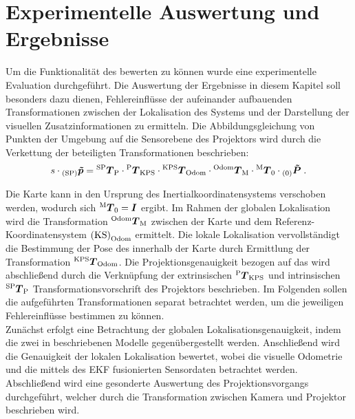 \chapter{Experimentelle Auswertung und Ergebnisse}
\label{chap.results}
\prever{
}


Um die Funktionalität des  bewerten zu können wurde eine experimentelle Evaluation durchgeführt. Die Auswertung der Ergebnisse in diesem Kapitel soll besonders dazu dienen, Fehlereinflüsse der aufeinander aufbauenden Transformationen zwischen der Lokalisation des Systems und der Darstellung der visuellen Zusatzinformationen zu ermitteln. Die Abbildungsgleichung von Punkten der Umgebung auf die Sensorebene des Projektors wird durch die Verkettung der beteiligten Transformationen beschrieben:
%
\begin{equation}
s \cdot {_{{\mathrm{(SP)}}}}\mbox{\boldmath{$\tilde{p}$}} = {^{\mathrm{SP}}\mbox{\boldmath{$T$}}_{\mathrm{P}}}\cdot{^{\mathrm{P}}\mbox{\boldmath{$T$}}_{\mathrm{KPS}}}\cdot{^{\mathrm{KPS}}\mbox{\boldmath{$T$}}_{\mathrm{Odom}}}\cdot{^{\mathrm{Odom}}\mbox{\boldmath{$T$}}_{\mathrm{M}}}\cdot{^{\mathrm{M}}\mbox{\boldmath{$T$}}_{\mathrm{0}}}\cdot{_{{\mathrm{(0)}}}}\mbox{\boldmath{$\tilde{P}$}} \; \text{.}
\end{equation}

Die Karte kann in den Ursprung des Inertialkoordinatensystems verschoben werden, wodurch sich ${^{\mathrm{M}}\mbox{\boldmath{$T$}}_{\mathrm{0}}} = \mbox{\boldmath{$I$}}$ ergibt. Im Rahmen der globalen Lokalisation wird die Transformation ${^{\mathrm{Odom}}\mbox{\boldmath{$T$}}_{\mathrm{M}}}$ zwischen der Karte und dem Referenz-Koordinatensystem ${\mathrm{(KS)}}_{\mathrm{Odom}}$ ermittelt. Die lokale Lokalisation vervollständigt die Bestimmung der Pose des  innerhalb der Karte durch Ermittlung der Transformation ${^{\mathrm{KPS}}\mbox{\boldmath{$T$}}_{\mathrm{Odom}}}$. Die Projektionsgenauigkeit bezogen auf das \kps{} wird abschließend durch die Verknüpfung der extrinsischen ${^{\mathrm{P}}\mbox{\boldmath{$T$}}_{\mathrm{KPS}}}$ und intrinsischen ${^{\mathrm{SP}}\mbox{\boldmath{$T$}}_{\mathrm{P}}}$ Transformationsvorschrift des Projektors beschrieben. Im Folgenden sollen die aufgeführten Transformationen separat betrachtet werden, um die jeweiligen Fehlereinflüsse bestimmen zu können.\\

\prever{
}
Zunächst erfolgt eine Betrachtung der globalen Lokalisationsgenauigkeit, indem die zwei in  beschriebenen Modelle gegenübergestellt werden. Anschließend wird die Genauigkeit der lokalen Lokalisation bewertet, wobei die visuelle Odometrie und die mittels des EKF fusionierten Sensordaten betrachtet werden. Abschließend wird eine gesonderte Auswertung des Projektionsvorgangs durchgeführt, welcher durch die Transformation zwischen Kamera und Projektor beschrieben wird.\\

